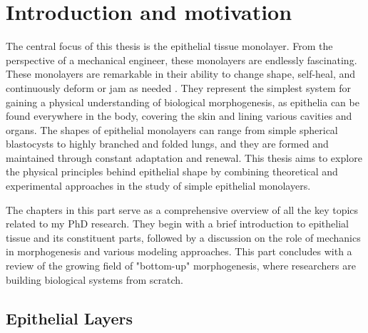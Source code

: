 \documentclass[11pt, final, a4paper, twoside, openright]{book}
\begin{document}
	\InitializeThesis
	
	 
	
	
	
	\frontmatter
	
	
	
	
	\mainmatter
	\part{Introduction and motivation}\label{part_1}
	
	The central focus of this thesis is the epithelial tissue monolayer. From the perspective of a mechanical engineer, these monolayers are endlessly fascinating. These monolayers are remarkable in their ability to change shape, self-heal, and continuously deform or jam as needed \cite{xi2018}. They represent the simplest system for gaining a physical understanding of biological morphogenesis, as epithelia can be found everywhere in the body, covering the skin and lining various cavities and organs. The shapes of epithelial monolayers can range from simple spherical blastocysts to highly branched and folded lungs, and they are formed and maintained through constant adaptation and renewal. This thesis aims to explore the physical principles behind epithelial shape by combining theoretical and experimental approaches in the study of simple epithelial monolayers.
	
	The chapters in this part serve as a comprehensive overview of all the key topics related to my PhD research. They begin with a brief introduction to epithelial tissue and its constituent parts, followed by a discussion on the role of mechanics in morphogenesis and various modeling approaches. This part concludes with a review of the growing field of "bottom-up" morphogenesis, where researchers are building biological systems from scratch.


	\renewcommand{\thesection}{1.\arabic{section}}
	\hypertarget{epithelial-layers}{%
	\chapter{Epithelial Layers}\label{epithelial-layers}}
	
\end{document}
